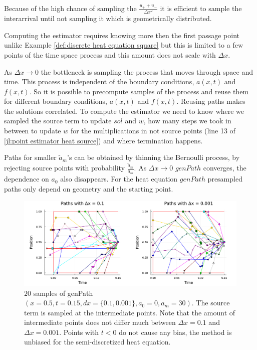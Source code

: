 \documentclass[a4paper,12pt]{article}
\begin{document}
\begin{julia}\label{jl:point estimator heat source}
  Because of the high chance of sampling the $\frac{u_{+} + u_{-}}{\Delta x^{2}}$ it is efficient
  to sample the interarrival until not sampling it which is geometrically distributed.

\end{julia}

Computing the estimator requires knowing more then the first passage point
unlike Example \ref{def:discrete heat equation square} but this is limited
to a few points of the time space process and this amount does not scale with $\Delta x$.


\begin{technique} \label{tech:presampling heat}
  As $\Delta x \rightarrow 0$ the bottleneck is sampling the process that moves through space and time.
  This process is independent of the boundary conditions, $a(x,t)$ and $f(x,t)$. So it is possible to
  precompute samples of the process and reuse them for different boundary conditions, $a(x,t)$ and $f(x,t)$.
  Reusing paths makes the solutions correlated. To compute the estimator we need to know where we sampled the
  source term to update $sol$ and $w$, how many steps we took in between to update $w$ for the
  multiplications in not source points (line 13 of \ref{jl:point estimator heat source})
  and where termination happens.


  Paths for smaller $\tilde{a}_{m}$'s can be obtained by thinning the Bernoulli process,
  by rejecting source points with probability $\frac{\tilde{a}_{m}}{a_{m}}$. As $\Delta x \rightarrow 0$
  $genPath$ converges, the dependence on $a_{0}$ also disappears. For the heat equation
  $genPath$ presampled paths only depend on geometry and the starting point.

  \begin{figure}[h!]
    \centering
    \includegraphics[width=\textwidth]{./julia_plots/paths_pest_heat_varcoef.pdf}
    \caption{$20$ samples of genPath$(x=0.5,t=0.15,dx=\{0.1,0.001\},a_{0}=0,a_{m} = 30)$. The source term is sampled
    at the intermediate points. Note that the amount of
    intermediate points does not differ much between $\Delta x = 0.1$ and $\Delta x = 0.001$.
    Points with $t<0$ do not cause any bias, the method is unbiased for the semi-discretized heat equation. }
    \label{fig:presampled paths pest heat var}
  \end{figure}


\end{technique}
\end{document}

